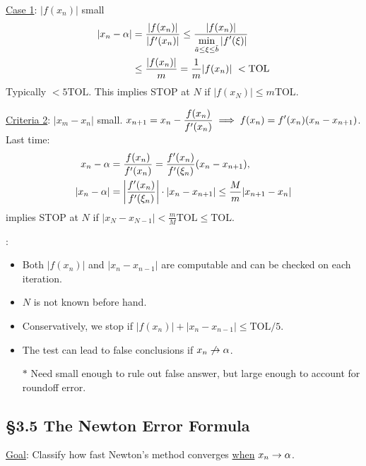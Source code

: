 \documentclass[]{article}
\begin{document}
\ul{Case 1}: $|f(x_n)|$ small
\begin{align*}
	|x_n-\alpha| &= \frac{|f(x_n)|}{|f'(x_n)|} \leq \frac{|f(x_n)|}{\ds\min_{\tilde a\leq\xi\leq\tilde b}|f'(\xi)|} \\
				 &\leq \frac{|f(x_n)|}m = \frac1m|f(x_n)|\ <\text{TOL}
\end{align*}
Typically $<5\text{TOL}$. This implies STOP at $N$ if $|f(x_N)|\leq m\text{TOL}$.

\ul{Criteria 2}: $|x_m-x_n|$ small. $\displaystyle x_{n+1} = x_n - \frac{f(x_n)}{f'(x_n)} \implies f(x_n) = f'(x_n) ( x_n-x_{n+1})$.
Last time:
\begin{align*}
	x_n - \alpha &= \frac{f(x_n)}{f'(x_n)} = \frac{f'(x_n)}{f'(\xi_n)}(x_n-x_{n+1}), \\
	|x_n-\alpha| &= \left|\frac{f'(x_n)}{f'(\xi_n)}\right|\cdot|x_n-x_{n+1}|
				 \leq \frac Mm|x_{n+1}-x_n|
\end{align*}
implies STOP at $N$ if $|x_N-x_{N-1}| < \frac mM\text{TOL} \leq \text{TOL}$.
\begin{note}:
	\begin{itemize}
		\item Both $|f(x_n)|$ and $|x_n-x_{n-1}|$ are computable and can be checked on each iteration.
		\item $N$ is not known before hand.
		\item Conservatively, we stop if $|f(x_n)|+|x_n-x_{n-1}|\leq \text{TOL}/5$.
		\item The test can lead to false conclusions if $x_n\not\rightarrow\alpha$.
	\end{itemize}
\end{note}
\begin{enumerate}
	\item[$*$] Need  small enough to rule out false answer, but large enough to account for roundoff error.
\end{enumerate}

\subsection*{\S3.5 The Newton Error Formula}

\ul{Goal}: Classify how fast Newton's method converges \ul{when} $x_n\rightarrow\alpha$.
\end{document}
